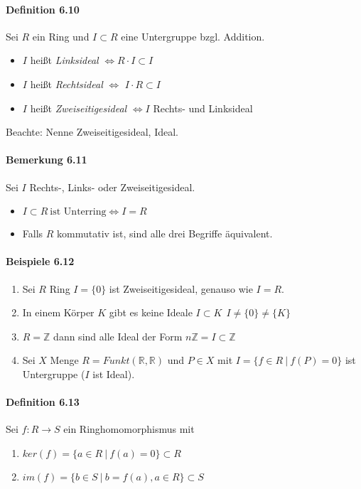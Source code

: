 \documentclass{scrartcl}
\begin{document}
\paragraph{Definition 6.10}
Sei $R$ ein Ring und $I \subset R$ eine Untergruppe bzgl. Addition.
\begin{itemize}
\item $I$ heißt \textit{Linksideal} $\Leftrightarrow R \cdot I \subset I$
\item $I$ heißt \textit{Rechtsideal} $\Leftrightarrow$ $I \cdot R \subset I$
\item $I$ heißt \textit{Zweiseitigesideal} $\Leftrightarrow I$ Rechts- und
  Linksideal
\end{itemize}
Beachte: Nenne Zweiseitigesideal, Ideal.

\paragraph{Bemerkung 6.11}
Sei $I$ Rechts-, Links- oder Zweiseitigesideal.
\begin{itemize}
\item $I \subset R ~\text{ist Unterring} \Leftrightarrow I = R$
\item Falls $R$ kommutativ ist, sind alle drei Begriffe äquivalent.
\end{itemize}

\paragraph{Beispiele 6.12}
\begin{enumerate}
\item Sei $R$ Ring $I = \{ 0 \}$ ist Zweiseitigesideal, genauso wie $I = R$.
\item In einem Körper $K$ gibt es keine Ideale $I \subset K~~I \neq \{ 0 \} \neq
  \{ K \}$
\item $R = \mathbb{Z}$ dann sind alle Ideal der Form $n \mathbb{Z} = I \subset
  \mathbb{Z}$
\item Sei $X$ Menge $R = Funkt(\mathbb{R}, \mathbb{R})$ und $P \in X$ mit $I =
  \{ f \in R ~|~ f(P) = 0\}$ ist Untergruppe ($I$ ist Ideal).
\end{enumerate}

\paragraph{Definition 6.13}
Sei $f: R \to S$ ein Ringhomomorphismus mit
\begin{enumerate}
\item $ker(f) = \{ a \in R ~|~ f(a) = 0\} \subset R$
\item $im(f) = \{ b  \in S ~|~ b = f(a), a \in R \} \subset S$
\end{enumerate}
\end{document}
